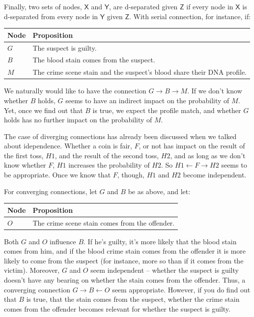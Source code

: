 \documentclass[
  10pt,
  dvipsnames,enabledeprecatedfontcommands]{scrartcl}
\begin{document}
Finally, two sets of nodes, \(\mathsf{X}\) and \(\mathsf{Y}\), are
d-separated given \(\mathsf{Z}\) if every node in \(\mathsf{X}\) is
d-separated from every node in \(\mathsf{Y}\) given \(\mathsf{Z}\). With
serial connection, for instance, if: \footnotesize 

\begin{center}
\begin{tabular}{@{}lp{4.3cm}@{}}\toprule
Node & Proposition \\ \midrule 
$G$ & The suspect is guilty. \\
$B$ & The blood stain comes from the suspect.\\
$M$ & The crime scene stain and the suspect's blood share their DNA profile.\\
\bottomrule
\end{tabular}
\end{center}
\normalsize

\noindent We naturally would like to have the connection
\(G \rightarrow B \rightarrow M\). If we don't know whether \(B\) holds,
\(G\) seems to have an indirect impact on the probability of \(M\). Yet,
once we find out that \(B\) is true, we expect the profile match, and
whether \(G\) holds has no further impact on the probability of \(M\).

The case of diverging connections has already been discussed when we
talked about idependence. Whether a coin is fair, \(F\), or not has
impact on the result of the first toss, \(H1\), and the result of the
second toss, \(H2\), and as long as we don't know whether \(F\), \(H1\)
increases the probability of \(H2\). So
\(H1 \leftarrow F \rightarrow H2\) seems to be appropriate. Once we know
that \(F\), though, \(H1\) and \(H2\) become independent.

For converging connections, let \(G\) and \(B\) be as above, and let:

\begin{center}
\begin{tabular}{@{}lp{4.3cm}@{}}\toprule
Node & Proposition \\ \midrule 
$O$ & The crime scene stain comes from the offender.\\
\bottomrule
\end{tabular}
\end{center}
\normalsize

\noindent Both \(G\) and \(O\) influence \(B\). If he's guilty, it's
more likely that the blood stain comes from him, and if the blood crime
stain comes from the offender it is more likely to come from the suspect
(for instance, more so than if it comes from the victim). Moreover,
\(G\) and \(O\) seem independent -- whether the suspect is guilty
doesn't have any bearing on whether the stain comes from the offender.
Thus, a converging connection \(G\rightarrow B \leftarrow O\) seem
appropriate. However, if you do find out that \(B\) is true, that the
stain comes from the suspect, whether the crime stain comes from the
offender becomes relevant for whether the suspect is guilty.
\end{document}
